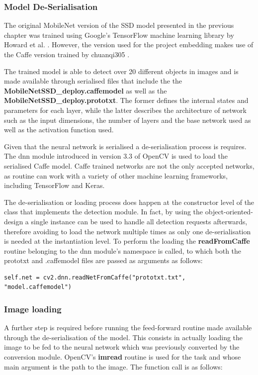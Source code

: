 \subsubsection{Model De-Serialisation}

The original MobileNet version of the SSD model presented in the previous chapter was trained using Google's TensorFlow machine learning library by Howard et al. \cite{paper:MobileNets}. However, the version used for the project embedding makes use of the Caffe version trained by chuanqi305 \cite{website:chuanqi305}.

The trained model is able to detect over 20 different objects in images and is made available through serialised files that include the the \textbf{MobileNetSSD\_deploy.caffemodel} as well as the \textbf{MobileNetSSD\_deploy.prototxt}. The former defines the internal states and parameters for each layer, while the latter describes the architecture of network such as the input dimensions, the number of layers and the base network used as well as the activation function used.

Given that the neural network is serialised a de-serialisation process is requires. The dnn module introduced in version 3.3 of OpenCV is used to load the serialised Caffe model. Caffe trained networks are not the only accepted networks, as routine can work with a variety of other machine learning frameworks, including TensorFlow and Keras.

The de-serialisation or loading process does happen at the constructor level of the class that implements the detection module. In fact, by using the object-oriented-design a single instance can be used to handle all detection requests afterwards, therefore avoiding to load the network multiple times as only one de-serialisation is needed at the instantiation level. To perform the loading the \textbf{readFromCaffe} routine belonging to the dnn module's namespace is called, to which both the prototxt and .caffemodel files are passed as arguments as follows:

\begin{lstlisting}
self.net = cv2.dnn.readNetFromCaffe("prototxt.txt", "model.caffemodel")
\end{lstlisting}

\subsubsection{Image loading}

A further step is required before running the feed-forward routine made available through the de-serialisation of the model. This consists in actually loading the image to be fed to the neural network which was previously converted by the conversion module. OpenCV's \textbf{imread} routine is used for the task and whose main argument is the path to the image. The function call is as follows:

